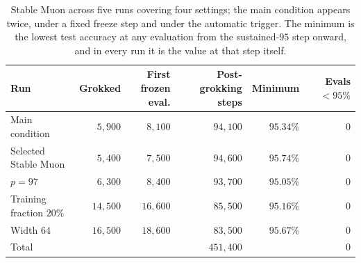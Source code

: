 \begin{table}[t]
\centering\small
\caption{Stable Muon across five runs covering four settings; the main condition appears
twice, under a fixed freeze step and under the automatic trigger. The minimum is the lowest
test accuracy at
any evaluation from the sustained-$95$ step onward, and in every run it is the value at
that step itself.}
\label{tab:stable}
\begin{tabular}{lrrrrr}
\toprule
Run & Grokked & \shortstack{First frozen\\eval.} & Post-grokking steps & Minimum & Evals $<95\%$ \\
\midrule
Main condition & $5{,}900$ & $8{,}100$ & $94{,}100$ & $95.34\%$ & $0$ \\
Selected Stable Muon & $5{,}400$ & $7{,}500$ & $94{,}600$ & $95.74\%$ & $0$ \\
$p = 97$ & $6{,}300$ & $8{,}400$ & $93{,}700$ & $95.05\%$ & $0$ \\
Training fraction $20\%$ & $14{,}500$ & $16{,}600$ & $85{,}500$ & $95.16\%$ & $0$ \\
Width $64$ & $16{,}500$ & $18{,}600$ & $83{,}500$ & $95.67\%$ & $0$ \\
\midrule
Total & & & $451{,}400$ & & $0$ \\
\bottomrule
\end{tabular}
\end{table}
